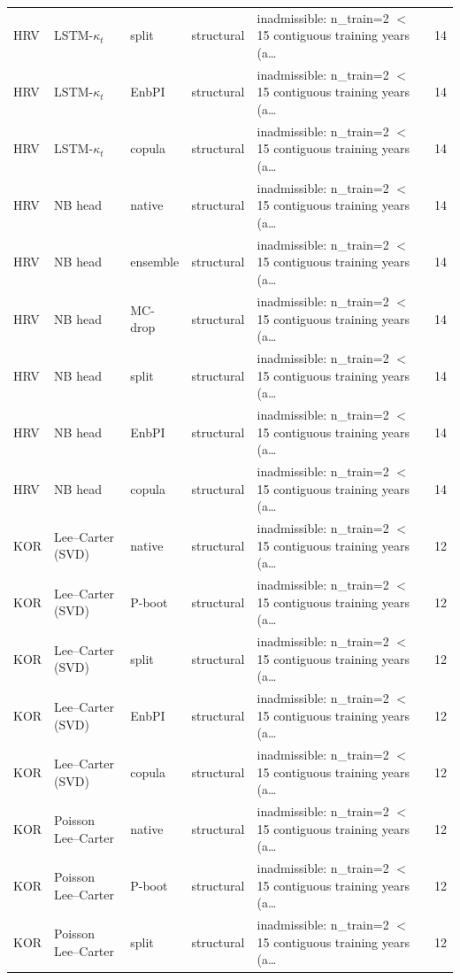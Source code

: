 {\begin{longtable}{@{}lllp{1.6cm}p{6.2cm}r@{}}
HRV & LSTM-$\kappa_t$ & split & structural & inadmissible: n\_train=2 $<$ 15 contiguous training years (a\ldots & 14 \\
HRV & LSTM-$\kappa_t$ & EnbPI & structural & inadmissible: n\_train=2 $<$ 15 contiguous training years (a\ldots & 14 \\
HRV & LSTM-$\kappa_t$ & copula & structural & inadmissible: n\_train=2 $<$ 15 contiguous training years (a\ldots & 14 \\
HRV & NB head & native & structural & inadmissible: n\_train=2 $<$ 15 contiguous training years (a\ldots & 14 \\
HRV & NB head & ensemble & structural & inadmissible: n\_train=2 $<$ 15 contiguous training years (a\ldots & 14 \\
HRV & NB head & MC-drop & structural & inadmissible: n\_train=2 $<$ 15 contiguous training years (a\ldots & 14 \\
HRV & NB head & split & structural & inadmissible: n\_train=2 $<$ 15 contiguous training years (a\ldots & 14 \\
HRV & NB head & EnbPI & structural & inadmissible: n\_train=2 $<$ 15 contiguous training years (a\ldots & 14 \\
HRV & NB head & copula & structural & inadmissible: n\_train=2 $<$ 15 contiguous training years (a\ldots & 14 \\
KOR & Lee--Carter (SVD) & native & structural & inadmissible: n\_train=2 $<$ 15 contiguous training years (a\ldots & 12 \\
KOR & Lee--Carter (SVD) & P-boot & structural & inadmissible: n\_train=2 $<$ 15 contiguous training years (a\ldots & 12 \\
KOR & Lee--Carter (SVD) & split & structural & inadmissible: n\_train=2 $<$ 15 contiguous training years (a\ldots & 12 \\
KOR & Lee--Carter (SVD) & EnbPI & structural & inadmissible: n\_train=2 $<$ 15 contiguous training years (a\ldots & 12 \\
KOR & Lee--Carter (SVD) & copula & structural & inadmissible: n\_train=2 $<$ 15 contiguous training years (a\ldots & 12 \\
KOR & Poisson Lee--Carter & native & structural & inadmissible: n\_train=2 $<$ 15 contiguous training years (a\ldots & 12 \\
KOR & Poisson Lee--Carter & P-boot & structural & inadmissible: n\_train=2 $<$ 15 contiguous training years (a\ldots & 12 \\
KOR & Poisson Lee--Carter & split & structural & inadmissible: n\_train=2 $<$ 15 contiguous training years (a\ldots & 12 \\

\end{longtable}}
